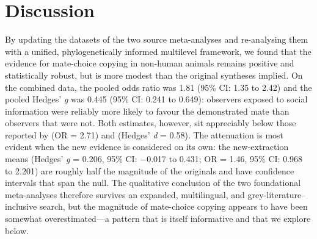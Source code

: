%

\section{Discussion}

By updating the datasets of the two source meta-analyses and re-analysing them
with a unified, phylogenetically informed multilevel framework, we found that
the evidence for mate-choice copying in non-human animals remains positive and
statistically robust, but is more modest than the original syntheses implied.
On the combined data, the pooled odds ratio was 1.81 (95\% CI: 1.35 to 2.42)
and the pooled Hedges' \textit{g} was 0.445 (95\% CI: 0.241 to 0.649): observers
exposed to social information were reliably more likely to favour the
demonstrated mate than observers that were not. Both estimates, however, sit
appreciably below those reported by \textcite{jonesMechanismsSocialInfluence2019}
(OR = 2.71) and \textcite{daviesMetaanalysisFactorsInfluencing2020}
(Hedges' \textit{d} = 0.58). The attenuation is most evident when the new
evidence is considered on its own: the new-extraction means
(Hedges' \textit{g} = 0.206, 95\% CI: $-$0.017 to 0.431; OR = 1.46, 95\% CI:
0.968 to 2.201) are roughly half the magnitude of the originals and have
confidence intervals that span the null. The qualitative conclusion of the two
foundational meta-analyses therefore survives an expanded, multilingual, and
grey-literature--inclusive search, but the magnitude of mate-choice copying
appears to have been somewhat overestimated---a pattern that is itself
informative and that we explore below.

